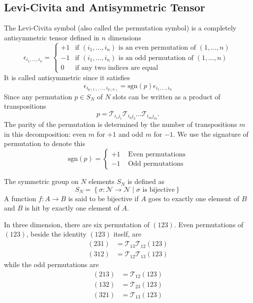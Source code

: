 \documentclass[../../../main.tex]{subfiles}
\begin{document}
\subsection{Levi-Civita and Antisymmetric Tensor}
The Levi-Civita symbol (also called the permutation symbol) is a completely antisymmetric tensor defined in $n$ dimensions
\begin{equation*}
  \epsilon_{i_1,\dots,i_n} =
  \begin{cases}
    +1 & \text{if } (i_1,\dots,i_n) \text{ is an even permutation of } (1,\dots,n) \\
    -1 & \text{if } (i_1,\dots,i_n) \text{ is an odd permutation of } (1,\dots,n)  \\
    0  & \text{if any two indices are equal}
  \end{cases}
\end{equation*}
It is called antisymmetric since it satisfies
\begin{equation*}
    \epsilon_{i_{p(1)},\dots,i_{p(n)}} = \mathrm{sgn}(p)  \epsilon_{i_1,\dots,i_n} 
\end{equation*}
Since any permutation $p\in S_N$ of $N$ slots can be written as a product of transpositions
\begin{equation*}
  p = \mathcal{T}_{i_1j_1} \mathcal{T}_{i_2j_2} \ldots\mathcal{T}_{i_mj_m}.
\end{equation*}
The parity of the permutation is determined by the number of transpositions $m$ in this decomposition: even $m$ for $+1$ and odd $m$ for $-1$.
We use the signature of permutation to denote this
\begin{equation*}
  \mathrm{sgn}(p) =
  \begin{cases}
    +1& \text{ Even permutations}\\
    -1& \text{ Odd permutations}
  \end{cases}
\end{equation*}

The symmetric group on $N$ elements $S_N$ is defined as 
\begin{equation*}
  S_N = \left\{ \sigma:\mathcal{N} \rightarrow \mathcal{N} \mid \sigma \text{ is bijective}  \right\} 
\end{equation*}
A function $f: A \to B$ is said to be bijective if $A$ goes to exactly one element of $B$ and $B$ is hit by exactly one element of $A$.

In three dimension, there are six permutation of $(123)$.
Even permutations of $(123)$, beside the identity $(123)$ itself, are
\begin{align*}
  (231) & =  \mathcal{T}_{13} \mathcal{T}_{12}(123) \\
  (312) & =  \mathcal{T}_{12} \mathcal{T}_{13}(123)
\end{align*}
while the odd permutations are
\begin{align*}
  (213) & =  \mathcal{T}_{12}(123) \\
  (132) & =  \mathcal{T}_{23}(123) \\
  (321) & =  \mathcal{T}_{13}(123)
\end{align*}
\end{document}
